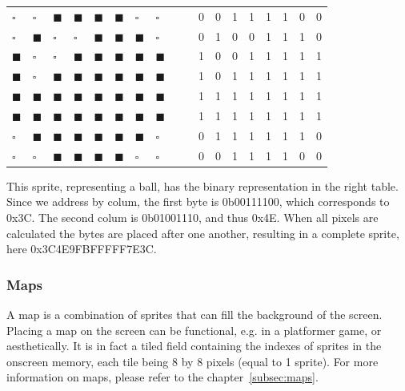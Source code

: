			\begin{table}[h]
			\centering
				\begin{tabular}{m{0.2em} m{0.2em} m{0.2em} m{0.2em} m{0.2em} m{0.2em} m{0.2em} m{0.2em} cccccccccc}
					$\square$      & $\square$      & $\blacksquare$ & $\blacksquare$ & $\blacksquare$ & $\blacksquare$ & $\square$      & $\square$      &&& 0 & 0 & 1 & 1 & 1 & 1 & 0 & 0 \\
					$\square$      & $\blacksquare$ & $\square$      & $\square$      & $\blacksquare$ & $\blacksquare$ & $\blacksquare$ & $\square$      &&& 0 & 1 & 0 & 0 & 1 & 1 & 1 & 0 \\
					$\blacksquare$ & $\square$      & $\square$      & $\blacksquare$ & $\blacksquare$ & $\blacksquare$ & $\blacksquare$ & $\blacksquare$ &&& 1 & 0 & 0 & 1 & 1 & 1 & 1 & 1 \\
					$\blacksquare$ & $\square$      & $\blacksquare$ & $\blacksquare$ & $\blacksquare$ & $\blacksquare$ & $\blacksquare$ & $\blacksquare$ &&& 1 & 0 & 1 & 1 & 1 & 1 & 1 & 1 \\
					$\blacksquare$ & $\blacksquare$ & $\blacksquare$ & $\blacksquare$ & $\blacksquare$ & $\blacksquare$ & $\blacksquare$ & $\blacksquare$ &&& 1 & 1 & 1 & 1 & 1 & 1 & 1 & 1 \\
					$\blacksquare$ & $\blacksquare$ & $\blacksquare$ & $\blacksquare$ & $\blacksquare$ & $\blacksquare$ & $\blacksquare$ & $\blacksquare$ &&& 1 & 1 & 1 & 1 & 1 & 1 & 1 & 1 \\
					$\square$      & $\blacksquare$ & $\blacksquare$ & $\blacksquare$ & $\blacksquare$ & $\blacksquare$ & $\blacksquare$ & $\square$      &&& 0 & 1 & 1 & 1 & 1 & 1 & 1 & 0 \\
					$\square$      & $\square$      & $\blacksquare$ & $\blacksquare$ & $\blacksquare$ & $\blacksquare$ & $\square$      & $\square$      &&& 0 & 0 & 1 & 1 & 1 & 1 & 0 & 0 \\
				\end{tabular}
			\end{table}
			
			This sprite, representing a ball, has the binary representation in the right table.
			Since we address by colum, the first byte is 0b00111100, which corresponds to 0x3C.
			The second colum is 0b01001110, and thus 0x4E.
			When all pixels are calculated the bytes are placed after one another, resulting in a complete sprite, here 0x3C4E9FBFFFFF7E3C.

		\subsubsection{Maps}
			\par A map is a combination of sprites that can fill the background of the screen.
			Placing a map on the screen can be functional, e.g. in a platformer game, or aesthetically.
			It is in fact a tiled field containing the indexes of sprites in the onscreen memory, each tile being 8 by 8 pixels (equal to 1 sprite).
			For more information on maps, please refer to the chapter~\ref{subsec:maps}.

